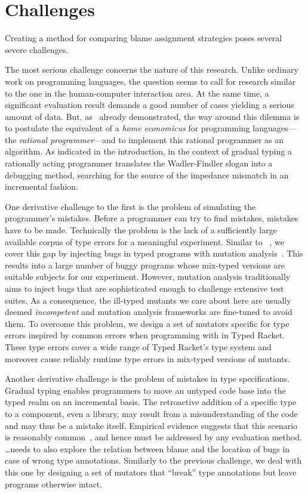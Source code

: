 
\section{Challenges}

Creating a method for comparing blame assignment strategies poses several severe
challenges.

The most serious challenge concerns the nature of this research. Unlike ordinary
work on programming languages, the question seems to call for research similar
to the one in the human-computer interaction area. At the same time, a
significant evaluation result demands a good number of cases yielding a serious
amount of data. But, as~\citet{lksfd-popl-2020} already demonstrated, the way
around this dilemma is to postulate the equivalent of a {\it home economicus\/}
for programming languages---the {\em rational programmer\/}---and to implement
this rational programmer as an algorithm. As indicated in the introduction, in
the context of gradual typing a rationally acting programmer translates the
Wadler-Findler slogan into a debugging method, searching for the source of the
impedance mismatch in an incremental fashion.

One derivative challenge to the first is the problem of simulating the
programmer's mistakes. Before a programmer can try to find mistakes, mistakes
have to be made. Technically the problem is the lack of a sufficiently large
available corpus of type errors for a meaningful experiment. Similar to
~\citet{lksfd-popl-2020}, we cover this gap by injecting bugs in typed programs
with mutation analysis~\cite{lipton1971fault, demillo1978hints,
jia2011analysis}. This results into a large number of buggy programs whose
mix-typed versions are suitable subjects for our experiment. However, mutation
analysis traditionally aims to inject bugs that are sophisticated enough to
challenge extensive test suites. As a consequence, the ill-typed mutants we care
about here are usually deemed \emph{incompetent} and mutation analysis
frameworks are fine-tuned to avoid them. To overcome this problem, we design a
set of mutators specific for type errors inspired by common errors when
programming with in Typed Racket.  These type errors cover a wide range of Typed
Racket's type system and moreover cause reliably runtime type errors in
mix-typed versions of mutants.

Another derivative challenge is the problem of mistakes in type specifications.
Gradual typing enables programmers to move an untyped code base into the typed
realm on an incremental basis. The retroactive addition of a specific type to a
component, even a library, may result from a misunderstanding of the code and
may thus be a mistake itself. Empirical evidence suggests that this scenario is
reasonably common~\cite{sta-nt-base-types, incorrect-ts, wmwz-ecoop-2017}, and
hence must be addressed by any evaluation method.  \ldots needs to also explore
the relation between blame and the location of bugs in case of wrong type
annotations. Similarly to the previous challenge, we deal with this one by
designing a set of mutators that ``break'' type annotations but leave programs
otherwise intact.

